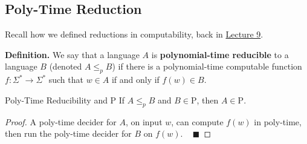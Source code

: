 \subsection{Poly-Time Reduction}

Recall how we defined reductions in computability,
back in \href{/18.404/lectures/9/#mapping-reducibility-eq-tm-eq-tm}{Lecture 9}.

\textbf{Definition.}
We say that a language $A$ is \textbf{polynomial-time reducible}
to a language $B$ (denoted $A \leq_p B$) if
there is a polynomial-time computable function
$f \colon \Sigma^* \to \Sigma^*$ such that
$w \in A$ if and only if $f(w) \in B$.

\begin{theorem}{Poly-Time Reducibility and P}
    If $A \leq_p B$ and $B \in \mathrm{P}$,
    then $A \in \mathrm{P}$.
\end{theorem}

\begin{proof}
    A poly-time decider for $A$, on input $w$,
    can compute $f(w)$ in poly-time,
    then run the poly-time decider for $B$ on $f(w)$.
    ~ $\blacksquare$
\end{proof}

